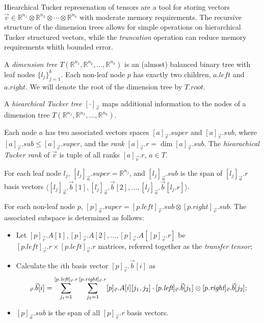 Hiearchical Tucker represenation of tensors are a tool for storing
vectors
$\vec{v} \in \mathbb{R}^{n_1} \otimes \mathbb{R}^{n_2} \otimes \cdots
\otimes \mathbb{R}^{n_k}$
with moderate memory requirements. The recursive structure of the
dimension trees allows for simple operations on hierarchical Tucker
structured vectors, while the \emph{truncation} operation can reduce
memory requirements whith bounded error.

\begin{dfn}
  A \emph{dimension tree}
  $T(\mathbb{R}^{n_1}, \mathbb{R}^{n_2}, \ldots, \mathbb{R}^{n_k})$ is
  an (almost) balanced binary tree with leaf nodes
  $\{l_j\}_{j = 1}^{k}$. Each non-leaf node $p$ has exactly two
  children, $a.\textit{left}$ and $a.\textit{right}$. We will denote
  the root of the dimension tree by $T.\textit{root}$.
\end{dfn}

\begin{dfn}
  A \emph{hiearchical Tucker tree} $[\cdot]_{\vec{v}}$
  maps additional information to the nodes of a dimension tree
  $T(\mathbb{R}^{n_1}, \mathbb{R}^{n_2}, \ldots, \mathbb{R}^{n_k})$.

  Each node $a$ has two associated vectors spaces
  $[a]_{\vec{v}}.\textit{super}$ and $[a]_{\vec{v}}.\textit{sub}$,
  where $[a]_{\vec{v}}.\textit{sub} \le [a]_{\vec{v}}.\textit{super}$,
  and the \emph{rank} $[a]_{\vec{v}}.r = \dim
  [a]_{\vec{v}}.\textit{sub}$. The \emph{hiearachical Tucker rank} of
  $\vec{v}$ is tuple of all ranks $[a]_{\vec{v}}.r$, $a \in T$.

  For each leaf node $l_j$,
  $[l_j]_{\vec{a}}.\textit{super} = \mathbb{R}^{n_j}$, and
  $[l_j]_{\vec{a}}.\textit{sub}$ is the span of $[l_j]_{\vec{a}}.r$
  basis vectors
  $\langle [l_j]_{\vec{a}}.\vec{b}[1], [l_j]_{\vec{a}}.\vec{b}[2],
  \ldots, [l_j]_{\vec{a}}.\vec{b}[l_j.r] \rangle$.

  For each non-leaf node $p$, $[p]_{\vec{a}}.\textit{super} =
  [p.\textit{left}]_{\vec{v}}.\textit{sub} \otimes
  [p.\textit{right}]_{\vec{v}}.\textit{sub}$. The associated subspace
  is determined as follows:
  \begin{itemize}
  \item Let
    $[p]_{\vec{v}}.A[1], [p]_{\vec{v}}.A[2], \ldots,
    [p]_{\vec{v}}.A[[p]_{\vec{v}}.r]$
    be
    $[p.\textit{left}]_{\vec{v}}.r \times
    [p.\textit{left}]_{\vec{v}}.r$ matrices, referred together as the
    \emph{transfer tensor};
  \item Calculate the $i$th basis vector $[p]_{\vec{v}}.\vec{b}[i]$ as
    \begin{equation}
      [p]_{\vec{v}}.\vec{b}[i] = \sum_{j_1 =
        1}^{[p.\textit{left}]_{\vec{v}}.r} \sum_{j_2 =
        1}^{[p.\textit{right}]_{\vec{v}}.r} [p]_{\vec{v}}.A[i][j_1,
      j_2] \cdot
      [p.\textit{left}]_{\vec{v}}.\vec{b}[j_1] \otimes
      [p.\textit{right}]_{\vec{v}}.\vec{b}[j_2] \text;
    \end{equation}
  \item $[p]_{\vec{a}}.\textit{sub}$ is the span of all
    $[p]_{\vec{v}}.r$ basis vectors.
  \end{itemize}
\end{dfn}

